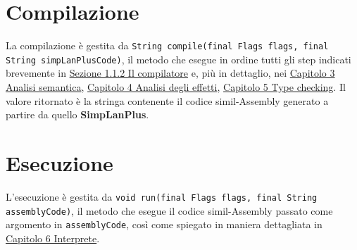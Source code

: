 \documentclass[../report.tex]{subfiles}
\begin{document}
\section{Compilazione}\label{s:compilazione}
La compilazione è gestita da \verb|String compile(final Flags flags, final String simpLanPlusCode)|, il metodo che esegue in ordine tutti gli step indicati brevemente in \hyperref[ss:compilatore]{Sezione 1.1.2 Il compilatore} e, più in dettaglio, nei \hyperref[c:analisi-semantica]{Capitolo 3 Analisi semantica}, \hyperref[c:analisi-effetti]{Capitolo 4 Analisi degli effetti}, \hyperref[c:typechecking]{Capitolo 5 Type checking}.
Il valore ritornato è la stringa contenente il codice simil-Assembly generato a partire da quello \textbf{SimpLanPlus}.

\section{Esecuzione}\label{s:esecuzione}
L'esecuzione è gestita da \verb|void run(final Flags flags, final String assemblyCode)|, il metodo che esegue il codice simil-Assembly passato come argomento in \verb|assemblyCode|, così come spiegato in maniera dettagliata in \hyperref[c:interprete]{Capitolo 6 Interprete}.
\end{document}
